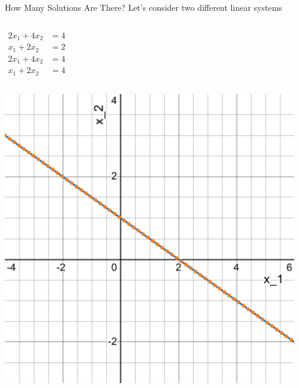 \documentclass[xcoler=dvipsnames, aspectratio=169]{beamer}
\begin{document}
\begin{frame}{How Many Solutions Are There?}
    Let's consider two different linear systems
    \begin{columns}
        \begin{align*}
            2x_1 + 4x_2 &= 4\\
            x_1 + 2x_2 &= 2
        \end{align*}
        \begin{align*}
            2x_1 + 4x_2 &= 4\\
            x_1 + 2x_2 &= 4
        \end{align*}
    \end{columns}
    \pause
    \begin{columns}
            \begin{center}
                \includegraphics[height=.5\textheight]{images/infiniteSolutions.pdf}
            \end{center}
            \begin{center}

\end{center}
\end{columns}
\end{frame}
\end{document}
